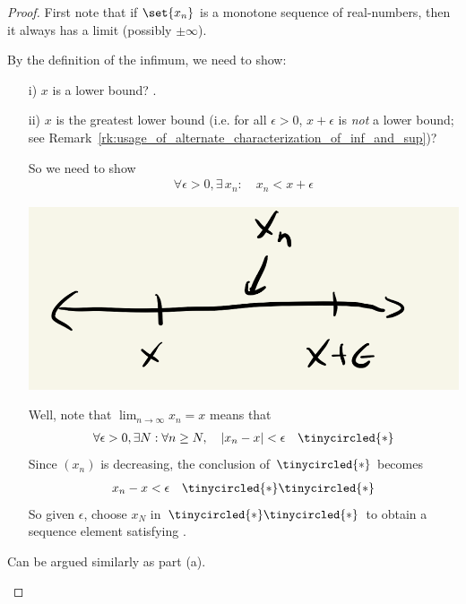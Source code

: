 \documentclass{article} %
\begin{document}
\begin{proof}
First note that if $\set{x_n}$ is a monotone sequence of real-numbers, then it always has a limit (possibly $\pm \infty$). 

\begin{alphabate}
\item By the definition of the infimum, we need to show:

\begin{itemize}
\item[i)] $x$ is a lower bound? \greencheck.
\item[ii)]	$x$ is the greatest lower bound (i.e. for all $\epsilon > 0$, $x+ \epsilon$ is \textit{not} a lower bound;  see Remark~\ref{rk:usage_of_alternate_characterization_of_inf_and_sup})? 

So we need to show 
\begin{align}
 \forall \epsilon > 0, \exists\, x_n :  \quad x_n < x + \epsilon
\label{eqn:glb_property_for_decreasing_sequences}
\end{align}

\begin{center}
\includegraphics[width=.4\linewidth]{images/lim_of_decreasing_sequence_is_infimum}
\end{center}

Well, note that $\lim_{n \to \infty} x_n = x$ means that 
%
\begin{align*}
\forall \epsilon>0 , \exists N : \forall n \geq N, \quad 
 |x_n - x | < \epsilon && \tinycircled{\ast} 
\end{align*} 
Since $(x_n)$ is decreasing, the conclusion of  $\tinycircled{\ast}$ becomes 
\begin{align*}
x_n - x  < \epsilon && \tinycircled{\ast}\tinycircled{\ast} 
\end{align*} 
So given $\epsilon$, choose $x_N$ in $\tinycircled{\ast} \tinycircled{\ast}$ to obtain a sequence element satisfying .
\end{itemize}

\item Can be argued similarly as part (a).
\end{alphabate}
  
\end{proof}
\end{document}
